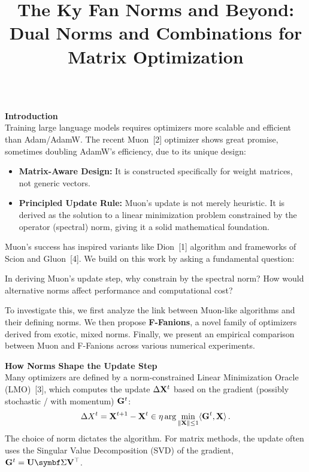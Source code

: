 \documentclass[fontsize=10pt]{beamer}
\title{The Ky Fan Norms and Beyond: Dual Norms and Combinations for Matrix Optimization}
\begin{document}
\begin{frame}[fragile]
\begin{columns}[T]
\hspace{0.02\textwidth}%
\begin{column}{0.30\textwidth}
\setlength{\parskip}{0.7em}
\setlength{\parindent}{0pt}
\Large

\textbf{\Huge\color{Zen}Introduction}\\[0.3em]

Training large language models requires optimizers more scalable and efficient than Adam/AdamW. The recent Muon~[2] optimizer shows great promise, sometimes doubling AdamW's efficiency, due to its unique design:
\begin{itemize}
  \item \textbf{\color{HazySummerEve}Matrix-Aware Design:} It is constructed specifically for weight matrices, not generic vectors.
  \item \textbf{\color{HazySummerEve}Principled Update Rule:} Muon's update is not merely heuristic. It is derived as the solution to a linear minimization problem constrained by the operator (spectral) norm, giving it a solid mathematical foundation.
\end{itemize}

Muon's success has inspired variants like Dion~[1] algorithm and frameworks of Scion and Gluon~[4]. We build on this work by asking a fundamental question:
\begin{attention}
In deriving Muon's update step, why constrain by the spectral norm? How would alternative norms affect performance and computational cost?
\end{attention}
To investigate this, we first analyze the link between Muon-like algorithms and their defining norms. We then propose \textbf{\color{HazySummerEve}F-Fanions}, a novel family of optimizers derived from exotic, mixed norms. Finally, we present an empirical comparison between Muon and F-Fanions across various numerical experiments.

\vspace{0.5em}
\textbf{\Huge\color{Zen}How Norms Shape the Update Step}\\[0.3em]

Many optimizers are defined by a norm-constrained Linear Minimization Oracle (LMO)~[3], which computes the update $\Delta\mathbf{X}^t$ based on the gradient (possibly stochastic / with momentum) $\mathbf{G}^t$:
\begin{equation*}
    \Delta X^t = \mathbf{X}^{t+1} - \mathbf{X}^t \in \eta \arg\min_{\Vert{\mathbf{X}}\Vert \leq 1} \langle{\mathbf{G}^t},{\mathbf{X}}\rangle\,.
\end{equation*}
The choice of norm dictates the algorithm. For matrix methods, the update often uses the Singular Value Decomposition (SVD) of the gradient, $\mG^t = \mU \mSigma \mV^\top$.


\end{column}
\end{columns}
\end{frame}
\end{document}
